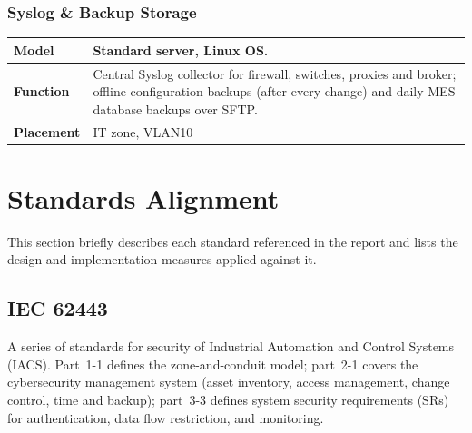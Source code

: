 \documentclass{report}
\begin{document}
\subsection{Syslog \& Backup Storage}

\renewcommand{\arraystretch}{1.3} %
\begin{tabularx}{\textwidth}{>{\bfseries}p{2.5cm} X}
    \toprule
    Model & Standard server, Linux OS. \\
    \midrule
    Function & Central Syslog collector for firewall, switches, proxies and
    broker; offline configuration backups (after every change) and daily MES
    database backups over SFTP.\\
    \midrule
    Placement & IT zone, VLAN10\\
    \midrule
\end{tabularx}

\chapter{Standards Alignment}\label{chap:8-standards}
This section briefly describes each standard referenced in the report and lists
the design and implementation measures applied against it.

\section{IEC 62443}
A series of standards for security of Industrial Automation and Control Systems (IACS). Part~1-1 defines the zone-and-conduit model; part~2-1 covers the cybersecurity management system (asset inventory, access management, change control, time and backup); part~3-3 defines system security requirements (SRs) for authentication, data flow restriction, and monitoring.
\end{document}
